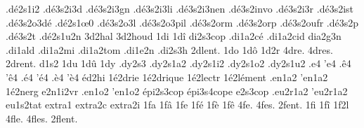 {                    .d\'e2s1i2
                    .d\'e3s2i3d
                    .d\'e3s2i3gn
                    .d\'e3s2i3li
                    .d\'e3s2i3nen
                    .d\'e3s2invo
                    .d\'e3s2i3r
                    .d\'e3s2ist
                    .d\'e3s2o3d\'e
                    .d\'e2s1\oe0 %
                    .d\'e3s2o3l
                    .d\'e3s2o3pil
                    .d\'e3s2orm
                    .d\'e3s2orp
                    .d\'e3s2oufr
                    .d\'e3s2p %
                    .d\'e3s2t %
                    .d\'e2s1u2n
                    3d2hal
                    3d2houd
1di
1d\^i
                    di2s3cop
                    .di1a2c\'e
                    .di1a2cid
                    dia2g3n
                    .di1ald
                    .di1a2mi
                    .di1a2tom
                    .di1e2n
                    .di2s3h
2dlent. %
1do
1d\^o
1d2r
4dre.
4dres.
2drent. %
d1s2
1du
1d\^u
1dy
                    .dy2s3
                    .dy2s1a2
                    .dy2s1i2
                    .dy2s1o2 %
                    .dy2s1u2
.e4
'e4
.\^e4
'\^e4
.\'e4
'\'e4
.\`e4
'\`e4
\'ed2hi %
                    1\'e2drie
                    1\'e2drique
                    1\'e2lectr
                    1\'e2l\'ement
                    .en1a2
                    'en1a2
                    1\'e2nerg
                    e2n1i2vr
                    .en1o2
                    'en1o2
                    \'epi2s3cop
                    \'epi3s4cope
                    e2s3cop
                    .eu2r1a2
                    'eu2r1a2
                    eu1s2tat
                    extra1
                    extra2c
                    extra2i
1fa
1f\^a
1fe
1f\'e
1f\`e
1f\^e
4fe.
4fes.
2fent. %
%
1fi
1f\^i
1f2l
4fle.
4fles.
2flent. %
}

